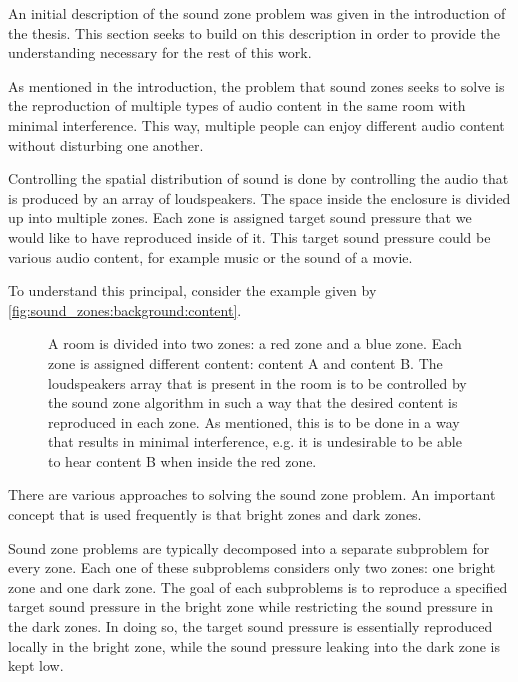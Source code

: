 An initial description of the sound zone problem was given in the introduction of the thesis.
This section seeks to build on this description in order to provide the understanding necessary 
for the rest of this work.

As mentioned in the introduction, the problem that sound zones seeks to solve is the reproduction
of multiple types of audio content in the same room with minimal interference.
This way, multiple people can enjoy different audio content without disturbing one another.

Controlling the spatial distribution of sound is done by controlling the 
audio that is produced by an array of loudspeakers.
The space inside the enclosure is divided up into multiple zones.
Each zone is assigned target sound pressure that we would like to have reproduced inside of it.
This target sound pressure could be various audio content, for example music or the sound of a movie.

To understand this principal, consider the example given by \autoref{fig:sound_zones:background:content}.

\begin{figure}[h]
    \centering
    \scalebox{1.0}{}
    \caption{A room is divided into two zones: a red zone and a blue zone.
        Each zone is assigned different content: content A and content B.
        The loudspeakers array that is present in the room is to be controlled by the sound zone algorithm 
        in such a way that the desired content is reproduced in each zone.
        As mentioned, this is to be done in a way that results in minimal interference, e.g. it is undesirable
        to be able to hear content B when inside the red zone.}
    \label{fig:sound_zones:background:content}
\end{figure}

There are various approaches to solving the sound zone problem.
An important concept that is used frequently is that bright zones and dark zones.

Sound zone problems are typically decomposed into a separate subproblem for every zone.
Each one of these subproblems considers only two zones: one bright zone and one dark zone.
The goal of each subproblems is to reproduce a specified target sound pressure in the bright zone while restricting the 
sound pressure in the dark zones.
In doing so, the target sound pressure is essentially reproduced locally in the bright zone,
while the sound pressure leaking into the dark zone is kept low.

